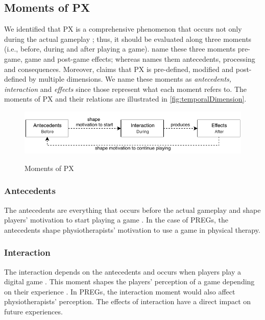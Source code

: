 \subsection{Moments of \ac{PX}}
We identified that \ac{PX} is a comprehensive phenomenon that occurs not only during the actual gameplay \autocite{Mayra}; thus, it should be evaluated along three moments \autocite{Elson2014,Fernandez2008,Nackea2,Nackea,Nacked} (i.e., before, during and after playing a game). \textcite{Elson2014} name these three moments pre-game, game and post-game effects; whereas \textcite{Fernandez2008} names them antecedents, processing and consequences. Moreover, \textcite{Mayra} claims that \ac{PX} is pre-defined, modified and post-defined by multiple dimensions. We name these moments as \textit{antecedents, interaction} and \textit{effects} since those represent what each moment refers to. The moments of \ac{PX} and their relations are illustrated in \autoref{fig:temporalDimension}.

\begin{figure}[bth]
\myfloatalign
{\includegraphics[width=\linewidth]{gfx/model/temporalDimension}} \quad
\caption{Moments of \ac{PX}}\label{fig:temporalDimension}
\end{figure}

\subsubsection{Antecedents}
The antecedents are everything that occurs before the actual gameplay and shape players' motivation to start playing a game \autocite{Fernandez2008,Ferrara}. In the case of \acp{PREG}, the antecedents shape physiotherapists' motivation to use a game in physical therapy.

\subsubsection{Interaction}
The interaction depends on the antecedents and occurs when players play a digital game \autocite{Elson2014,Fernandez2008,Nacked}. This moment shapes the players' perception of a game depending on their experience \autocite{Fernandez2008}. In \acp{PREG}, the interaction moment would also affect physiotherapists' perception. The effects of interaction have a direct impact on future experiences.

